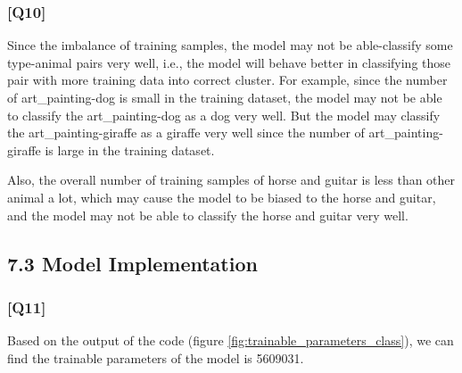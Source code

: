 \documentclass{article}
\begin{document}
\subsubsection*{[Q10]}
Since the imbalance of training samples, the model may not be able-classify some type-animal pairs very well, i.e., the model will behave better in classifying those pair with more training data into correct cluster. 
For example, since the number of art\_painting-dog is small in the training dataset, the model may not be able to classify the art\_painting-dog as a dog very well. 
But the model may classify the art\_painting-giraffe as a giraffe very well since the number of art\_painting-giraffe is large in the training dataset.

Also, the overall number of training samples of horse and guitar is less than other animal a lot, which may cause the model to be biased to the horse and guitar, and the model may not be able to classify the horse and guitar very well.


\subsection*{7.3 Model Implementation}

\subsubsection*{[Q11]}

Based on the output of the code (figure \ref{fig:trainable_parameters_class}), we can find the trainable parameters of the model is 5609031.
\end{document}
